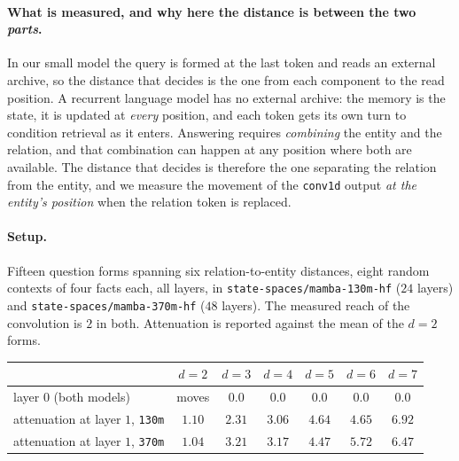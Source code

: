 \documentclass[11pt,a4paper]{article}
\begin{document}
\paragraph{What is measured, and why here the distance is between the two \emph{parts}.} In our small
model the query is formed at the last token and reads an external archive, so the distance that
decides is the one from each component to the read position. A recurrent language model has no
external archive: the memory is the state, it is updated at \emph{every} position, and each token
gets its own turn to condition retrieval as it enters. Answering requires \emph{combining} the entity
and the relation, and that combination can happen at any position where both are available. The
distance that decides is therefore the one separating the relation from the entity, and we measure
the movement of the \texttt{conv1d} output \emph{at the entity's position} when the relation token is
replaced.

\paragraph{Setup.} Fifteen question forms spanning six relation-to-entity distances, eight random
contexts of four facts each, all layers, in \texttt{state-spaces/mamba-130m-hf} ($24$ layers) and
\texttt{state-spaces/mamba-370m-hf} ($48$ layers). The measured reach of the convolution is $2$ in
both. Attenuation is reported against the mean of the $d{=}2$ forms.

\begin{center}
\begin{tabular}{lcccccc}
\toprule
& $d{=}2$ & $d{=}3$ & $d{=}4$ & $d{=}5$ & $d{=}6$ & $d{=}7$ \\
\midrule
layer $0$ (both models) & moves & $\mathbf{0.0}$ & $\mathbf{0.0}$ & $\mathbf{0.0}$ & $\mathbf{0.0}$ & $\mathbf{0.0}$ \\
\midrule
attenuation at layer $1$, \texttt{130m} & $1.10$ & $2.31$ & $3.06$ & $4.64$ & $4.65$ & $6.92$ \\
attenuation at layer $1$, \texttt{370m} & $1.04$ & $3.21$ & $3.17$ & $4.47$ & $5.72$ & $6.47$ \\
\bottomrule
\end{tabular}
\end{center}
\end{document}
